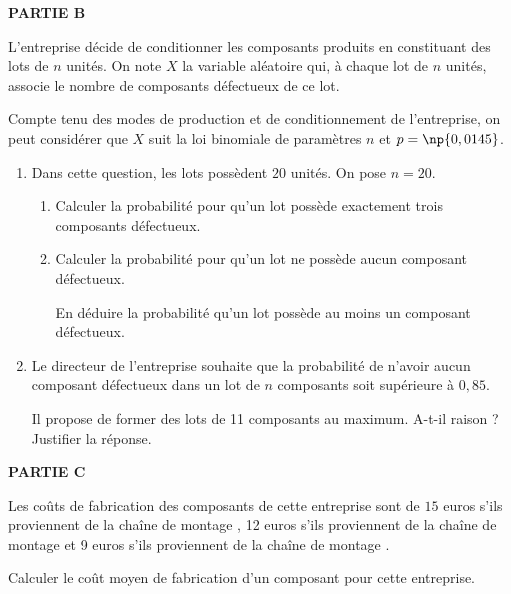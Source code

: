 \medskip

\textbf{PARTIE B}

\medskip

L'entreprise décide de conditionner les composants produits en constituant des lots de $n$ unités. On note $X$ la variable aléatoire qui, à chaque lot de $n$ unités, associe le nombre de composants défectueux de ce lot. 

Compte tenu des modes de production et de conditionnement de l'entreprise, on peut considérer que $X$ suit la loi binomiale de paramètres $n$ et $p = \np{0,0145}$.

\medskip

\begin{enumerate}
\item Dans cette question, les lots possèdent $20$ unités. On pose $n =20$.
	\begin{enumerate}
		\item Calculer la probabilité pour qu'un lot possède exactement trois composants défectueux.
		\item Calculer la probabilité pour qu'un lot ne possède aucun composant défectueux.
		
En déduire la probabilité qu'un lot possède au moins un composant défectueux.
	\end{enumerate}
\item  Le directeur de l'entreprise souhaite que la probabilité de n'avoir aucun composant
défectueux dans un lot de $n$ composants soit supérieure à $0,85$. 

Il propose de former des lots de 11 composants au maximum. A-t-il raison ? Justifier la réponse.
\end{enumerate}

\medskip

\textbf{PARTIE C}

\medskip

Les coûts de fabrication des composants de cette entreprise sont de $15$ euros s'ils proviennent de la chaîne de montage , 12 euros s'ils proviennent de la chaîne de montage  et 9 euros s'ils proviennent de la chaîne de montage .

Calculer le coût moyen de fabrication d'un composant pour cette entreprise.

\bigskip
